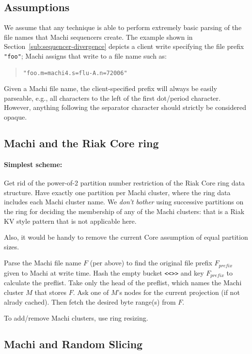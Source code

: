 \documentclass[preprint,10pt]{sigplanconf}
\begin{document}
\subsection{Assumptions}

We assume that any technique is able to perform extremely basic
parsing of the file names that Machi sequencers create.  The example
shown in Section~\ref{sub:sequencer-divergence} depicts a client write
specifying the file prefix {\tt "foo"}; Machi assigns that write to a
file name such as:
\begin{quote}
{\tt "foo.m=machi4.s=flu-A.n=72006"}
\end{quote}

Given a Machi file name, the client-specified prefix will always be
easily parseable, e.g., all characters to the left of the first
dot/period character.  However, anything following the separator
character should strictly be considered opaque.

\subsection{Machi and the Riak Core ring}
\label{sub:integration-riak-core}

\paragraph{Simplest scheme:}
Get rid of the power-of-2 partition number restriction of the Riak
Core ring data structure.  Have exactly one partition per Machi
cluster, where the ring data includes each Machi cluster name.  We
{\em don't bother} using successive partitions on the ring for
deciding the membership of any of the Machi clusters: that is a Riak KV
style pattern that is not applicable here.

Also, it would be handy to remove the current Core assumption of equal
partition sizes.

Parse the Machi file name $F$ (per above) to find the original
file prefix $F_{prefix}$ given to Machi at write time.
Hash the empty bucket {\tt <<>>} and key $F_{prefix}$ to
calculate the preflist. Take only the head of
the preflist, which names the Machi cluster $M$ that stores $F$.  Ask
one of $M$'s nodes for the current projection (if not alrady cached).
Then fetch the desired byte range(s) from $F$.

To add/remove Machi clusters, use ring resizing.  

\subsection{Machi and Random Slicing}
\label{sub:integration-random-slicing}
\end{document}
